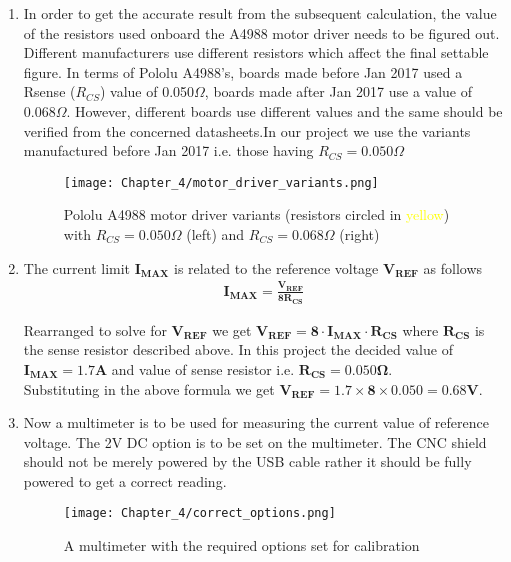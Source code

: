 \begin{enumerate}
 \item In order to get the accurate result from the subsequent calculation, the value of the resistors used onboard the A4988 motor driver needs to be figured out. Different manufacturers use different resistors which affect the final settable figure. In terms of Pololu A4988's, boards made before Jan 2017 used a Rsense ($R_{CS}$) value of 0.050$\Omega$, boards made after Jan 2017 use a value of 0.068$\Omega$. However, different boards use different values and the same should be verified from the concerned datasheets.In our project we use the variants manufactured before Jan 2017 i.e. those having $R_{CS} = 0.050\Omega$

       \begin{figure}[h]
        \centering
        \texttt{[image: Chapter\_4/motor\_driver\_variants.png]}
        \caption{Pololu A4988 motor driver variants (resistors circled in \textcolor{yellow}{yellow}) with  $R_{CS} = 0.050\Omega$ (left) and $R_{CS} = 0.068\Omega$ (right)}
        \label{fig:driver_variants}
       \end{figure}

 \item  The current limit $\boldsymbol{I_{MAX}}$ is related to the reference voltage $\boldsymbol{V_{REF}}$ as follows
       \begin{align}
        \boldsymbol{I_{MAX} = \frac{V_{REF}}{8R_{CS}}} \nonumber
       \end{align}

       Rearranged to solve for $\boldsymbol{V_{REF}}$ we get
       $ \boldsymbol{V_{REF} = 8 \cdot I_{MAX} \cdot R_{CS}}$  where $\boldsymbol{R_{CS}}$ is the sense resistor described above. In this project the decided value of $\boldsymbol{I_{MAX}= 1.7A}$  and value of sense resistor i.e. $\boldsymbol{R_{CS} = 0.050\Omega}$. \\
       Substituting in the above formula we get  $\boldsymbol{V_{REF} = 1.7\times8\times0.050 = 0.68V}$.

 \item  Now a multimeter is to be used for measuring the current value of reference voltage. The 2V DC option is to be set on the multimeter. The CNC shield should not be merely powered by the USB cable rather it should be fully powered to get a correct reading.

       \begin{figure}[h]
        \centering
        \texttt{[image: Chapter\_4/correct\_options.png]}
        \caption{A multimeter with the required options set for calibration}
        \label{fig:correct_options}
       \end{figure}



\end{enumerate}
